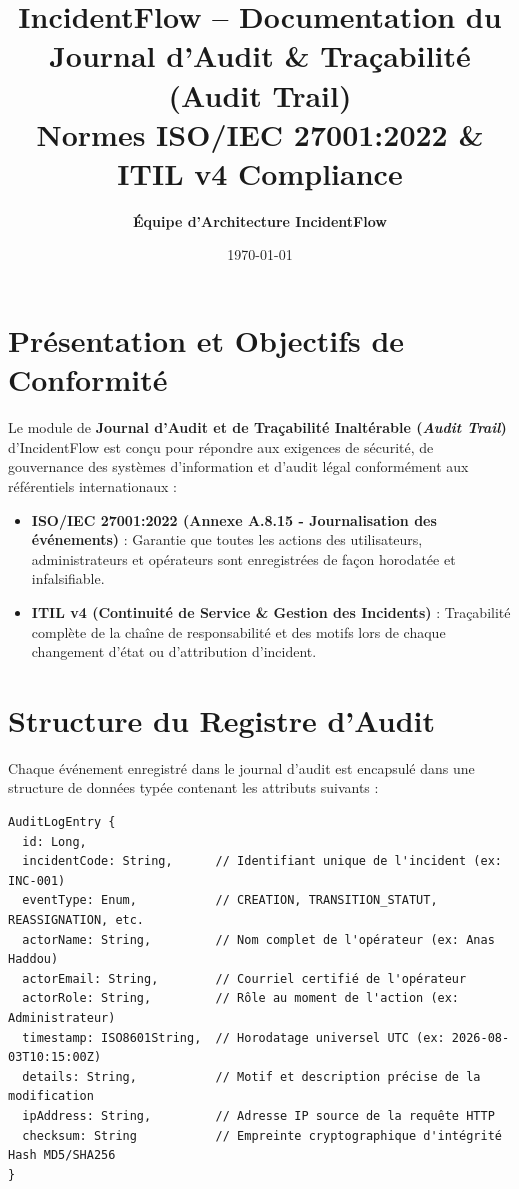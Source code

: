 \documentclass[11pt,a4paper]{article}
\title{\textbf{\Large IncidentFlow -- Documentation du Journal d'Audit \& Traçabilité (Audit Trail)}\\\large Normes ISO/IEC 27001:2022 \& ITIL v4 Compliance}
\author{\textbf{Équipe d'Architecture IncidentFlow}}
\date{\today}
\begin{document}
\maketitle

\section{Présentation et Objectifs de Conformité}

Le module de \textbf{Journal d'Audit et de Traçabilité Inaltérable (\textit{Audit Trail})} d'IncidentFlow est conçu pour répondre aux exigences de sécurité, de gouvernance des systèmes d'information et d'audit légal conformément aux référentiels internationaux :
\begin{itemize}
    \item \textbf{ISO/IEC 27001:2022 (Annexe A.8.15 - Journalisation des événements)} : Garantie que toutes les actions des utilisateurs, administrateurs et opérateurs sont enregistrées de façon horodatée et infalsifiable.
    \item \textbf{ITIL v4 (Continuité de Service \& Gestion des Incidents)} : Traçabilité complète de la chaîne de responsabilité et des motifs lors de chaque changement d'état ou d'attribution d'incident.
\end{itemize}

\section{Structure du Registre d'Audit}

Chaque événement enregistré dans le journal d'audit est encapsulé dans une structure de données typée contenant les attributs suivants :

\begin{verbatim}
AuditLogEntry {
  id: Long,
  incidentCode: String,      // Identifiant unique de l'incident (ex: INC-001)
  eventType: Enum,           // CREATION, TRANSITION_STATUT, REASSIGNATION, etc.
  actorName: String,         // Nom complet de l'opérateur (ex: Anas Haddou)
  actorEmail: String,        // Courriel certifié de l'opérateur
  actorRole: String,         // Rôle au moment de l'action (ex: Administrateur)
  timestamp: ISO8601String,  // Horodatage universel UTC (ex: 2026-08-03T10:15:00Z)
  details: String,           // Motif et description précise de la modification
  ipAddress: String,         // Adresse IP source de la requête HTTP
  checksum: String           // Empreinte cryptographique d'intégrité Hash MD5/SHA256
}
\end{verbatim}
\end{document}
